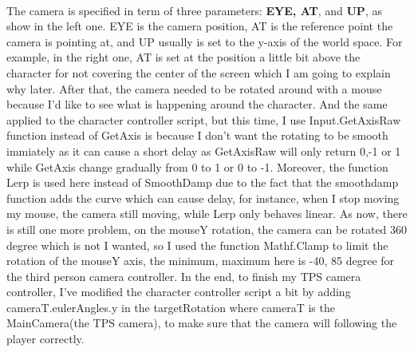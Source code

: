 \documentclass[a4paper, 13pt]{extarticle}
\begin{document}
  	\\[0.05cm]
 	 The camera is specified in term of three parameters: {\bfseries EYE, AT}, and {\bfseries UP}, as show in the left one. EYE is the camera position, AT is the reference point the camera is pointing at, and UP usually is set to the y-axis of the world space. For example, in the right one, AT is set at the position a little bit above the character for not covering the center of the screen which I am going to explain why later.
 	 After that, the camera needed to be rotated around with a mouse because I'd like to see what is happening around the character. And the same applied to the character controller script, but this time, I use Input.GetAxisRaw function instead of GetAxis is because I don't want the rotating to be smooth immiately as it can cause a short delay as GetAxisRaw will only return 0,-1 or 1 while GetAxis change gradually from 0 to 1 or 0 to -1.  
 	 Moreover, the function Lerp is used here instead of SmoothDamp due to the fact that the smoothdamp function adds the curve which can cause delay, for instance, when I stop moving my mouse, the camera still moving, while Lerp only behaves linear. As now, there is still one more problem, on the mouseY rotation, the camera can be rotated 360 degree which is not I wanted, so I used the function Mathf.Clamp to limit the rotation of the mouseY axis, the minimum, maximum here is -40, 85 degree for the third person camera controller. In the end, to finish my TPS camera controller, I've modified the character controller script a bit by adding cameraT.eulerAngles.y in the targetRotation where cameraT is the MainCamera(the TPS camera), to make sure that the camera will following the player correctly.
 	 
\end{document}
